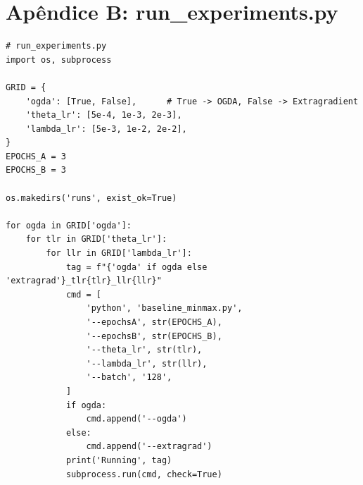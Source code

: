\documentclass[9pt,a4paper]{extarticle}
\begin{document}
\section*{Apêndice B: run\_experiments.py}
\begin{lstlisting}
# run_experiments.py
import os, subprocess

GRID = {
    'ogda': [True, False],      # True -> OGDA, False -> Extragradient
    'theta_lr': [5e-4, 1e-3, 2e-3],
    'lambda_lr': [5e-3, 1e-2, 2e-2],
}
EPOCHS_A = 3
EPOCHS_B = 3

os.makedirs('runs', exist_ok=True)

for ogda in GRID['ogda']:
    for tlr in GRID['theta_lr']:
        for llr in GRID['lambda_lr']:
            tag = f"{'ogda' if ogda else 'extragrad'}_tlr{tlr}_llr{llr}"
            cmd = [
                'python', 'baseline_minmax.py',
                '--epochsA', str(EPOCHS_A),
                '--epochsB', str(EPOCHS_B),
                '--theta_lr', str(tlr),
                '--lambda_lr', str(llr),
                '--batch', '128',
            ]
            if ogda:
                cmd.append('--ogda')
            else:
                cmd.append('--extragrad')
            print('Running', tag)
            subprocess.run(cmd, check=True)
\end{lstlisting}
\end{document}
